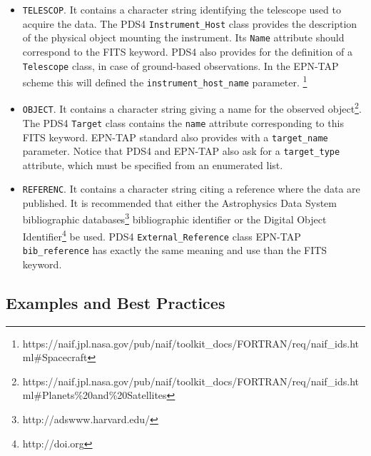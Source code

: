 \begin{itemize}
\item{\texttt{TELESCOP}.
It contains a character string identifying the telescope used to acquire the data.
The PDS4 \texttt{Instrument\_Host} class provides the description of the physical object
mounting the instrument. Its \texttt{Name} attribute should correspond to the FITS keyword.
PDS4 also provides for the definition of a \texttt{Telescope} class, in case of
ground-based observations.
In the EPN-TAP scheme this will defined the \texttt{instrument\_host\_name} parameter.
\footnote{https://naif.jpl.nasa.gov/pub/naif/toolkit\_docs/FORTRAN/req/naif\_ids.html\#Spacecraft}}

\item{\texttt{OBJECT}.
It contains a character string giving a name for the observed object\footnote{https://naif.jpl.nasa.gov/pub/naif/toolkit\_docs/FORTRAN/req/naif\_ids.html\#Planets\%20and\%20Satellites}.
The PDS4 \texttt{Target} class contains the \texttt{name} attribute corresponding to this
FITS keyword.
EPN-TAP standard also provides with a \texttt{target\_name} parameter.
Notice that PDS4 and EPN-TAP also ask for a \texttt{target\_type} attribute, which must be
specified from an enumerated list.}

%
%

\item{\texttt{REFERENC}.
It contains a character string citing a reference where the data are published.
It is recommended that either the Astrophysics Data System bibliographic databases\footnote{http://adswww.harvard.edu/}
bibliographic identifier or the Digital Object Identifier\footnote{http://doi.org}
be used.
PDS4 \texttt{External\_Reference} class 
EPN-TAP \texttt{bib\_reference} has exactly the same meaning and use than the FITS keyword.}

\end{itemize}

\subsection{Examples and Best Practices}

